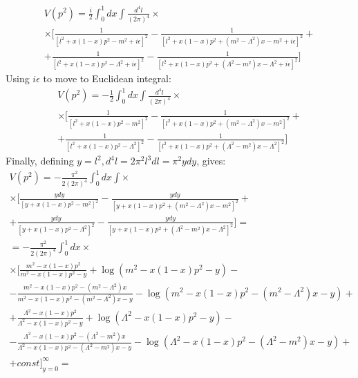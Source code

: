 \documentclass{article}
\begin{document}
\begin{equation}
\begin{gathered}
    V\left(p^2\right) = \frac{i}{2} \int_0^1 dx \int \frac{d^4l}{(2\pi)^4} \times \\ \times
    \Bigg[
        \frac{1}{\left[l^2 + x(1 - x) p^2 - m^2
        + i\epsilon\right]^2} -
        \frac{1}{\left[l^2 + x(1 - x) p^2 + \left(m^2 - \Lambda^2\right) x - m^2
        + i\epsilon\right]^2} + \\ +
        \frac{1}{\left[l^2 + x(1 - x) p^2 - \Lambda^2
        + i\epsilon\right]^2} -
        \frac{1}{\left[l^2 + x(1 - x) p^2 + \left(\Lambda^2 - m^2\right) x - \Lambda^2
        + i\epsilon\right]^2}
    \Bigg]
\end{gathered}
\end{equation}
Using $i\epsilon$ to move to Euclidean integral:
\begin{equation}
\begin{gathered}
    V\left(p^2\right) = -\frac{1}{2} \int_0^1 dx \int \frac{d^4l}{(2\pi)^4} \times \\ \times
    \Bigg[
        \frac{1}{\left[l^2 + x(1 - x) p^2 - m^2\right]^2} -
        \frac{1}{\left[l^2 + x(1 - x) p^2 + \left(m^2 - \Lambda^2\right) x - m^2\right]^2} + \\ +
        \frac{1}{\left[l^2 + x(1 - x) p^2 - \Lambda^2\right]^2} -
        \frac{1}{\left[l^2 + x(1 - x) p^2 + \left(\Lambda^2 - m^2\right) x - \Lambda^2\right]^2}
    \Bigg]
\end{gathered}
\end{equation}
Finally, defining $y = l^2, d^4l = 2\pi^2 l^3 dl = \pi^2 ydy$, gives:
\begin{equation}
\begin{gathered}
    V\left(p^2\right) = -\frac{\pi^2}{2(2\pi)^4} \int_0^1 dx \int \times \\ \times
    \Bigg[
        \frac{ydy}{\left[y + x(1 - x) p^2 - m^2\right]^2} -
        \frac{ydy}{\left[y + x(1 - x) p^2 + \left(m^2 - \Lambda^2\right) x - m^2\right]^2} + \\ +
        \frac{ydy}{\left[y + x(1 - x) p^2 - \Lambda^2\right]^2} -
        \frac{ydy}{\left[y + x(1 - x) p^2 + \left(\Lambda^2 - m^2\right) x - \Lambda^2\right]^2}
    \Bigg] = \\ =
    -\frac{\pi^2}{2(2\pi)^4} \int_0^1 dx \times \\ \times
    \Bigg[
        \frac{m^2 - x(1 - x) p^2}{m^2 - x(1 - x) p^2 - y} + \log(m^2 - x(1 - x) p^2 - y) - \\
        - \frac{m^2 - x(1 - x) p^2 - \left(m^2 - \Lambda^2\right) x}{m^2 - x(1 - x) p^2 - \left(m^2 - \Lambda^2\right) x - y} - \log(m^2 - x(1 - x) p^2 - \left(m^2 - \Lambda^2\right) x - y) + \\
        +
        \frac{\Lambda^2 - x(1 - x) p^2}{\Lambda^2 - x(1 - x) p^2 - y} + \log(\Lambda^2 - x(1 - x) p^2 - y) - \\
        -
        \frac{\Lambda^2 - x(1 - x) p^2 - \left(\Lambda^2 - m^2\right) x}{\Lambda^2 - x(1 - x) p^2 - \left(\Lambda^2 - m^2\right) x - y} - \log(\Lambda^2 - x(1 - x) p^2 - \left(\Lambda^2 - m^2\right) x - y) + \\
        + const
    \Bigg]_{y=0}^\infty =
\end{gathered}
\end{equation}
\end{document}
